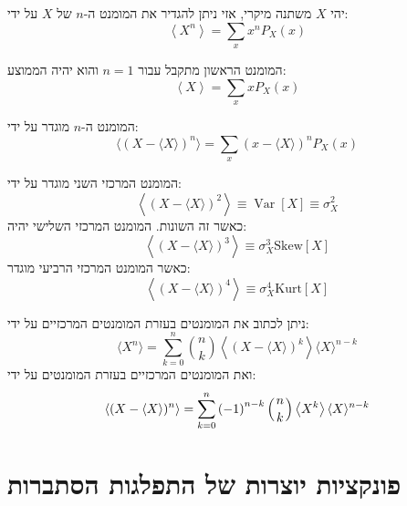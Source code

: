\documentclass{tstextbook}
\begin{document}
\begin{definition}[מומנט]
יהי \(X\) משתנה מיקרי, אזי ניתן להגדיר את המומנט ה-\(n\) של \(X\) על ידי:
$$\left\langle X^{n}\right\rangle=\sum_{x}x^{n}P_{X}\left(x\right)$$

\end{definition}
\begin{example}
המומנט הראשון מתקבל עבור \(n=1\) והוא יהיה הממוצע:
$$\left\langle X\right\rangle=\sum_{x}x P_{X}\left(x\right)$$

\end{example}
\begin{definition}
המומנט ה-\(n\) מוגדר על ידי:
$$\langle(X-\langle X\rangle)^{n}\rangle=\sum_{x}\left(x-\langle X\rangle\right)^{n}P_{X}\left(x\right)$$

\end{definition}
\begin{example}
המומנט המרכזי השני מוגדר על ידי:
$$\left\langle\left(X-\langle X\rangle\right)^{2}\right\rangle\equiv\operatorname{Var}\left[X\right]\equiv\sigma_{X}^{2}$$
כאשר זה השונות. המומנט המרכזי השלישי יהיה:
$$\left\langle\left(X-\langle X\rangle\right)^{3}\right\rangle\equiv\sigma_{X}^{3}\mathrm{Skew}\left[X\right]$$
כאשר המומנט המרכזי הרביעי מוגדר:
$$\left\langle\left(X-\langle X\rangle\right)^{4}\right\rangle\equiv\sigma_{X}^{4}\mathrm{Kurt}\left[X\right]$$

\end{example}
\begin{proposition}
ניתן לכתוב את המומנטים בעזרת המומנטים המרכזיים על ידי:
$$\langle X^{n}\rangle=\sum_{k=0}^{n}{\binom{n}{k}}\left\langle(X-\langle X\rangle)^{k}\right\rangle\langle X\rangle^{n-k}$$
ואת המומנטים המרכזיים בעזרת המומנטים על ידי:
$$\left\langle(X-\langle X\rangle)^{n}\right\rangle=\sum_{k=0}^{n}{(-1)}^{n-k}\left({n\atop k}\right)\left\langle X^{k}\right\rangle\langle X\rangle^{n-k}$$

\end{proposition}
\section{פונקציות יוצרות של התפלגות הסתברות}
\end{document}
